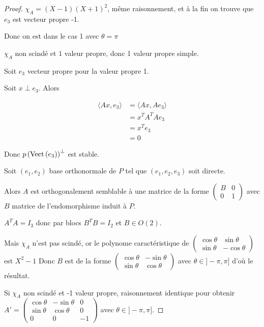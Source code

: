 \begin{proof}

    \svspace $\chi_A = (X - 1)(X + 1)^2$, même raisonnement, et à la fin on trouve que 
    $e_3$ est vecteur propre -1. 

    Donc on est dans le cas 1 avec $\theta = \pi$


    \svspace $\chi_A$ non scindé et $1$ valeur propre, donc 1 valeur propre simple. 

    Soit $e_3$ vecteur propre pour la valeur propre 1. 

    Soit $x \perp e_3$. Alors 

    \begin{align}
        \langle A x, e_3 \rangle & = \langle A x, A e_3 \rangle \\
        & = x^T A^T A e_3 \\
        & = x^T e_3 \\
        & = 0
    \end{align}

    Donc $p\left( \operatorname{Vect} \,(e_3) \right)^\perp$ est stable. 

    Soit $(e_1, e_2)$ base orthonormale de $P$ tel que $(e_1, e_2, e_3)$ soit directe. 

    Alors $A$ est orthogonalement semblable à une matrice de la forme $\begin{pmatrix}
        B & 0 \\
        0 & 1
    \end{pmatrix}$ avec $B$ matrice de l'endomorphisme induit à $P$. 

    $A^T A = I_3$ donc par blocs $B^T B = I_2$ et $B \in O(2)$.

    Mais $\chi_A$ n'est pas scindé, or le polynome caractéristique de 
    $\begin{pmatrix}
        \cos \theta & \sin \theta \\
        \sin \theta & - \cos \theta
    \end{pmatrix}$ est $X^2 - 1$ Donc $B$ est de la forme $\begin{pmatrix}
        \cos \theta & -\sin \theta \\
        \sin \theta & \cos \theta
    \end{pmatrix}$ avec $\theta \in ]- \pi, \pi]$ d'où le résultat. 


    Si $\chi_A$ non scindé et -1 valeur propre, raisonnement identique pour obtenir 
    $A' = \begin{pmatrix}
        \cos \theta & -\sin \theta & 0 \\
        \sin \theta & \cos \theta & 0 \\
        0 & 0 & -1
    \end{pmatrix}$ avec $\theta \in ]- \pi, \pi]$.
\end{proof}

